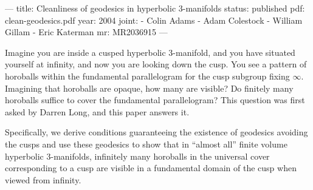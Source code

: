 ---
title: Cleanliness of geodesics in hyperbolic 3-manifolds
status: published
pdf: clean-geodesics.pdf
year: 2004
joint:
  - Colin Adams
  - Adam Colestock
  - William Gillam
  - Eric Katerman
mr: MR2036915
---

Imagine you are inside a cusped hyperbolic 3-manifold, and you have situated yourself at infinity, and now you are looking down the cusp.  You see a pattern of horoballs within the fundamental parallelogram for the cusp subgroup fixing $\infty$.  Imagining that horoballs are opaque, how many are visible?  Do finitely many horoballs suffice to cover the fundamental parallelogram?  This question was first asked by Darren Long, and this paper answers it.

Specifically, we derive conditions guaranteeing the existence of geodesics avoiding the cusps and use these geodesics to show that in ``almost all'' finite volume hyperbolic 3-manifolds, infinitely many horoballs in the universal cover corresponding to a cusp are visible in a fundamental domain of the cusp when viewed from infinity.
